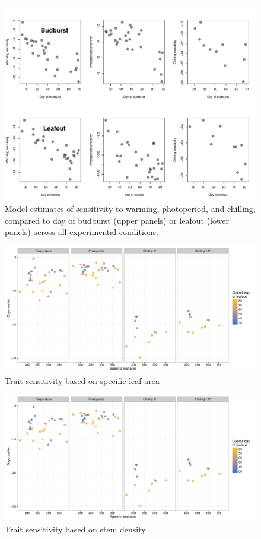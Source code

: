 \documentclass{article}
\begin{document}
\begin{figure}
\caption{Model estimates of sensitivity to warming, photoperiod, and chilling, compared to day of budburst (upper panels) or leafout (lower panels) across all experimental conditions.}
\label{figS4}
\includegraphics[scale=0.75]{Sens_vs_day}
\end{figure}

\clearpage

\begin{figure}
\caption{Trait sensitivity based on specific leaf area}
\label{figS5}
\includegraphics[scale=0.95, page=1]{Traits_vs_sensitivity}
\end{figure}

\begin{figure}
\caption{Trait sensitivity based on stem density}
\label{figS6}
\includegraphics[scale=0.95, page=2]{Traits_vs_sensitivity}
\end{figure}
\end{document}
